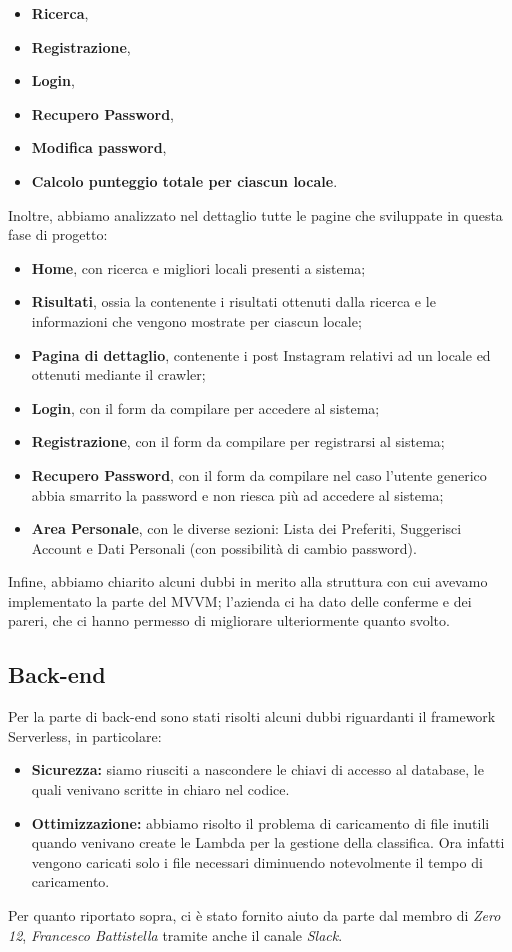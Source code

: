 \begin{itemize}
\item \textbf{Ricerca},
\item \textbf{Registrazione},
\item \textbf{Login},
\item \textbf{Recupero Password},
\item \textbf{Modifica password},
\item \textbf{Calcolo punteggio totale per ciascun locale}.
\end{itemize}

Inoltre, abbiamo analizzato nel dettaglio tutte le pagine che sviluppate in questa fase di progetto: 

\begin{itemize}
\item \textbf{Home}, con ricerca e migliori locali presenti a sistema;
\item \textbf{Risultati}, ossia la contenente i risultati ottenuti dalla ricerca e le informazioni che vengono mostrate per ciascun locale;
\item \textbf{Pagina di dettaglio}, contenente i post Instagram relativi ad un locale ed ottenuti mediante il crawler;
\item \textbf{Login}, con il form da compilare per accedere al sistema;
\item \textbf{Registrazione}, con il form da compilare per registrarsi al sistema;
\item \textbf{Recupero Password}, con il form da compilare nel caso l'utente generico abbia smarrito la password e non riesca più ad accedere al sistema;
\item \textbf{Area Personale}, con le diverse sezioni: Lista dei Preferiti, Suggerisci Account e Dati Personali (con possibilità di cambio password).
\end{itemize}

Infine, abbiamo chiarito alcuni dubbi in merito alla struttura con cui avevamo implementato la parte del MVVM; l'azienda ci ha dato delle conferme e dei pareri, che ci hanno permesso di migliorare ulteriormente quanto svolto.

\subsection{Back-end}
Per la parte di back-end sono stati risolti alcuni dubbi riguardanti il framework Serverless, in particolare:
\begin{itemize}
	\item \textbf{Sicurezza:} siamo riusciti a nascondere le chiavi di accesso al database, le quali venivano scritte in chiaro nel codice.
 	\item \textbf{Ottimizzazione:} abbiamo risolto il problema di caricamento di file inutili quando venivano create le Lambda per la gestione della classifica. 
	Ora infatti vengono caricati solo i file necessari diminuendo notevolmente il tempo di caricamento.
\end{itemize}

Per quanto riportato sopra, ci è stato fornito aiuto da parte dal membro di \textit{Zero 12}, \textit{Francesco Battistella} tramite anche il canale \textit{Slack}.


\pagebreak

